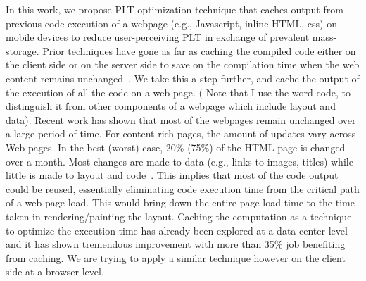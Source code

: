 In this work, we propose PLT optimization technique that caches output
from previous code execution of a webpage (e.g., Javascript, inline
HTML, css) on mobile devices to reduce user-perceiving PLT in exchange
of prevalent mass-storage.
Prior techniques have gone as far as caching the compiled code either
on the client side or on the server side to save on the compilation
time when the web content remains unchanged~\cite{wang2014much}. We
take this a step further, and cache the output of the execution of all
the code on a web page. ( Note that I use the word code, to
distinguish it from other components of a webpage which include layout
and data). Recent work has shown that most of the webpages remain
unchanged over a large period of time. For content-rich pages, the
amount of updates vary across Web pages. In the best (worst) case,
20\% (75\%) of the HTML page is changed over a month. Most changes are
made to data (e.g., links to images, titles) while little is made to
layout and code~\cite{wang2014much}.  This implies that most of the
code output could be reused, essentially eliminating code execution
time from the critical path of a web page load. This would bring down
the entire page load time to the time taken in rendering/painting the
layout. 
Caching the computation as a technique to optimize the execution time has
already been explored at a data center level~\cite{gunda2010nectar} and it has
shown tremendous improvement with more than 35\% job benefiting from caching.
We are trying to apply a similar technique however on the client side at a
browser level. 
